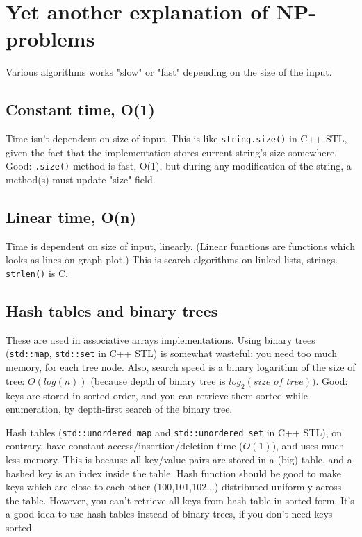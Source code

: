 \section{Yet another explanation of NP-problems}

Various algorithms works "slow" or "fast" depending on the size of the input.

\subsection{Constant time, O(1)}

Time isn't dependent on size of input.
This is like \verb|string.size()| in C++ STL, given the fact that the implementation stores current string's size somewhere.
Good: \verb|.size()| method is fast, O(1), but during any modification of the string, a method(s) must update "size" field.

\subsection{Linear time, O(n)}

Time is dependent on size of input, linearly.
(Linear functions are functions which looks as lines on graph plot.)
This is search algorithms on linked lists, strings.
\verb|strlen()| is C.

\subsection{Hash tables and binary trees}

These are used in associative arrays implementations.
Using binary trees (\verb|std::map|, \verb|std::set| in C++ STL) is somewhat wasteful: you need too much memory, for each tree node.
Also, search speed is a binary logarithm of the size of tree: $O(log(n))$ (because depth of binary tree is $log_2(size\_of\_tree))$.
Good: keys are stored in sorted order, and you can retrieve them sorted while enumeration, by depth-first search of the binary tree.

Hash tables (\verb|std::unordered_map| and \verb|std::unordered_set| in C++ STL), on contrary, have constant access/insertion/deletion time
($O(1)$), and uses much less memory.
This is because all key/value pairs are stored in a (big) table, and a hashed key is an index inside the table.
Hash function should be good to make keys which are close to each other (100,101,102...) distributed uniformly across the table.
However, you can't retrieve all keys from hash table in sorted form.
It's a good idea to use hash tables instead of binary trees, if you don't need keys sorted.

